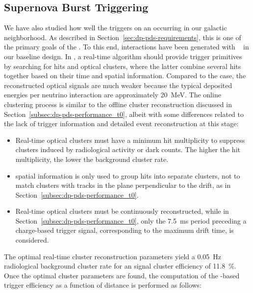 
\subsection{Supernova Burst Triggering}
\label{subsec:dp-pds-performance_trigger}

We have also studied how well the   triggers on an  occurring in our galactic neighborhood. As described in Section~\ref{sec:dp-pds-requirements}, this is one of the primary goals of the . To this end,  \nue {} interactions have been generated with ~\cite{marley} in our baseline  design. In , a real-time algorithm should provide trigger primitives by searching for  hits and optical clusters, where the latter combine several hits together based on their time and spatial information. Compared to the  case, the reconstructed optical signals are much weaker because the typical deposited energies per  neutrino interaction are approximately \SI{20}{\MeV}. The online clustering process is similar to the offline cluster reconstruction discussed in Section~\ref{subsec:dp-pds-performance_t0}, albeit with some differences related to the lack of trigger information and detailed event reconstruction at this stage:
%
\begin{itemize}
\item Real-time optical clusters must have a minimum hit multiplicity to suppress clusters induced by radiological activity or  dark counts. The higher the hit multiplicity, the lower the background cluster rate.
\item {} spatial information is only used to group hits into separate clusters,  not to match  clusters with  tracks in the plane perpendicular to the drift, as in Section~\ref{subsec:dp-pds-performance_t0}.
\item Real-time optical clusters must be continuously reconstructed, while in Section~\ref{subsec:dp-pds-performance_t0}, only the \SI{7.5}{\milli\s} period preceding a charge-based trigger signal, corresponding to the maximum drift time, is considered.
\end{itemize}
%
The optimal real-time cluster reconstruction parameters yield a \SI{0.05}{\Hz} radiological background cluster rate for an  \nue {} signal cluster efficiency of \SI{11.8}{\%}. Once the optimal cluster parameters are found, the computation of the -based  trigger efficiency as a function of  distance is performed as follows:

